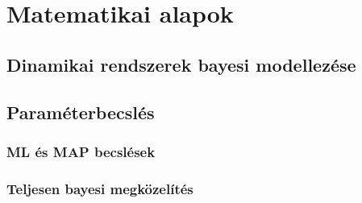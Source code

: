 \chapter{Matematikai alapok}
\label{ch:math}

\section{Dinamikai rendszerek bayesi modellezése}

\section{Paraméterbecslés}

\subsection{ML és MAP becslések}

\subsection{Teljesen bayesi megközelítés}
